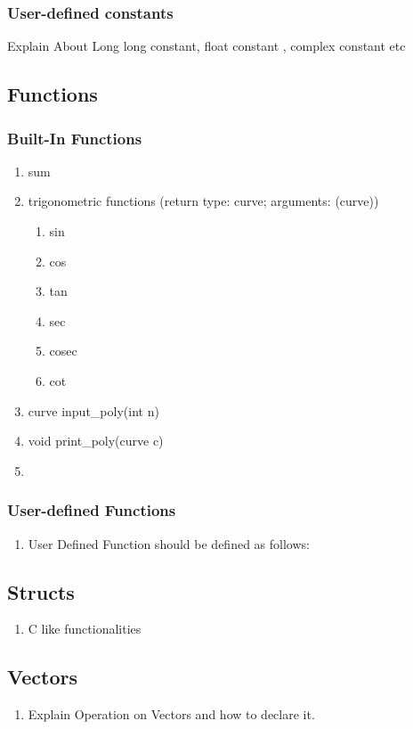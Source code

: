 \documentclass[12pt]{article}
\begin{document}
    \subsubsection{User-defined constants}
    Explain About Long long constant, float constant , complex constant etc
    \subsection{Functions}
    \subsubsection{Built-In Functions}
    \begin{enumerate}
        \item sum
        \item trigonometric functions (return type: curve; arguments: (curve)) \begin{enumerate}
            \item sin
            \item cos
            \item tan
            \item sec
            \item cosec
            \item cot
        \end{enumerate}

    \item curve input\_poly(int n)
    \item void print\_poly(curve c)
    \item 
    \end{enumerate}
    \subsubsection{User-defined Functions}
    \begin{enumerate}
        \item User Defined Function should be defined as follows:
    \end{enumerate}
    \subsection{Structs}
    \begin{enumerate}
        \item C like functionalities
    \end{enumerate}
    \subsection{Vectors}
    \begin{enumerate}
        \item Explain Operation on Vectors and how to declare it.
    \end{enumerate}
\end{document}
